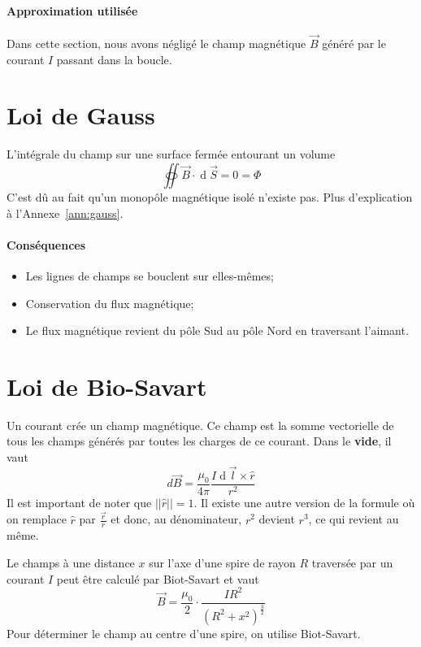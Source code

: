 \documentclass[11pt,a4paper]{article}
\newcommand{\B}{\vec B}
\DeclareMathOperator{\diff}{d}
\newcommand{\dif}{\diff\!}
\begin{document}
\paragraph{Approximation utilisée}
Dans cette section, nous avons négligé le champ magnétique $\B$ généré par le courant $I$ passant dans la boucle.

\section{Loi de Gauss}
L'intégrale du champ sur une surface fermée entourant un volume
\[ \oiint \B \cdot \dif \vec S = 0 = \Phi \]
C'est dû au fait qu'un monopôle magnétique isolé n'existe pas.
Plus d'explication à l'Annexe~\ref{ann:gauss}.
\paragraph{Conséquences}
\begin{itemize}
	\item Les lignes de champs se bouclent sur elles-mêmes;
	\item Conservation du flux magnétique;
	\item Le flux magnétique revient du pôle Sud au pôle Nord en traversant l'aimant.
\end{itemize}

\section{Loi de Bio-Savart}
\label{sec:bs}
Un courant crée un champ magnétique.
Ce champ est la somme vectorielle de tous les champs générés par toutes les charges de ce courant.
Dans le \textbf{vide}, il vaut
\[ d\B = \frac{\mu_0}{4\pi}\frac{I\dif \vec l\times \hat r}{r^2} \]
Il est important de noter que $||\hat r|| = 1$.
Il existe une autre version de la formule où on remplace $\hat r$ par $\frac{\vec r}{r}$ et donc, au dénominateur, $r^2$ devient $r^3$, ce qui revient au même.

Le champs à une distance $x$ sur l'axe d'une spire de rayon $R$ traversée par un courant $I$ peut être calculé par Biot-Savart et vaut
\[ \B = \frac{\mu_0}{2}\cdot\frac{IR^2}{(R^2 + x^2)^{\frac{3}{2}}} \]
Pour déterminer le champ au centre d'une spire, on utilise Biot-Savart.
\end{document}
